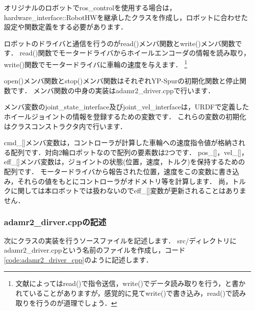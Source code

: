 \documentclass[{../../master}]{subfiles}
\begin{document}
オリジナルのロボットで\textsf{ros\_control}を使用する場合は，\textsf{hardware\_interface::RobotHW}を継承したクラスを作成し，ロボットに合わせた設定や関数定義をする必要があります．\cite{2018実用ロボット開発のためのrosプログラミング}

ロボットのドライバと通信を行うのが\textsf{read()}メンバ関数と\textsf{write()}メンバ関数です．
\textsf{read()}関数でモータードライバからホイールエンコーダの情報を読み取り，\textsf{write()}関数でモータードライバに車輪の速度を与えます．
\footnote{文献によっては\textsf{read()}で指令送信，\textsf{write()}でデータ読み取りを行う，と書かれていることがありますが，感覚的に見て\textsf{write()}で書き込み，\textsf{read()}で読み取りを行うのが道理でしょう．}

\textsf{open()}メンバ関数と\textsf{stop()}メンバ関数はそれぞれYP-Spurの初期化関数と停止関数です．
メンバ関数の中身の実装は\textsf{adamr2\_driver.cpp}で行います．

メンバ変数の\textsf{joint\_state\_interface}及び\textsf{joint\_vel\_interface}は，URDFで定義したホイールジョイントの情報を登録するための変数です．
これらの変数の初期化はクラスコンストラクタ内で行います．

\textsf{cmd\_[]}メンバ変数は，コントローラが計算した車輪への速度指令値が格納される配列です．対向2輪ロボットなので配列の要素数は2つです．
\textsf{pos\_[]}，\textsf{vel\_[]}，\textsf{eff\_[]}メンバ変数は，ジョイントの状態(位置，速度，トルク)を保持するための配列です．
モータードライバから報告された位置，速度をこの変数に書き込み，それらの値をもとにコントローラがオドメトリ等を計算します．
尚，トルクに関しては本ロボットでは扱わないので\textsf{eff\_[]}変数が更新されることはありません．

\subsubsection{\textsf{adamr2\_dirver.cpp}の記述}

次にクラスの実装を行うソースファイルを記述します．
\textsf{src/}ディレクトリに\textsf{adamr2\_driver.cpp}という名前のファイルを作成し，コード\ref{code:adamr2_driver_cpp}のように記述します．
\end{document}
